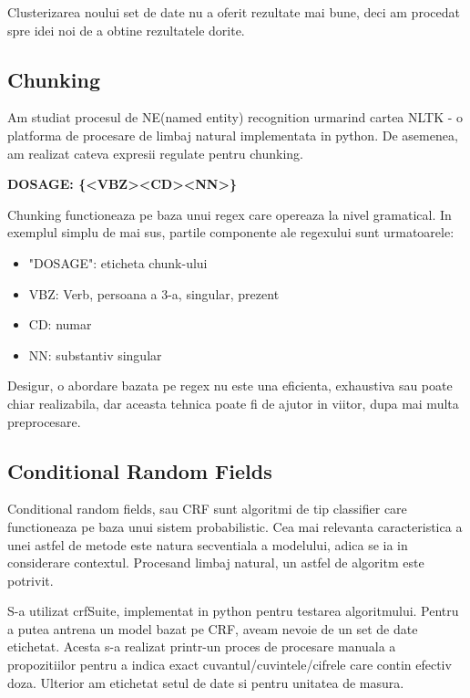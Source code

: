 \documentclass[a4paper,12pt]{article}
\begin{document}
 Clusterizarea noului set de date nu a oferit rezultate mai bune, deci am procedat spre idei noi de a obtine rezultatele dorite. 
 
 \subsection{Chunking}
 Am studiat procesul de NE(named entity) recognition urmarind cartea NLTK - o platforma de procesare de limbaj natural implementata in python.
 De asemenea, am realizat cateva expresii regulate pentru chunking. 
 
 \textbf{ DOSAGE: \{<VBZ><CD><NN>\}}

Chunking functioneaza pe baza unui regex care opereaza la nivel gramatical. In exemplul simplu de mai sus, partile componente ale regexului sunt urmatoarele:
\begin{itemize}
\item "DOSAGE": eticheta chunk-ului
\item VBZ: Verb, persoana a 3-a, singular, prezent
\item CD: numar
\item NN: substantiv singular
\end{itemize}

Desigur, o abordare bazata pe regex nu este una eficienta, exhaustiva sau poate chiar realizabila, dar aceasta tehnica poate fi de ajutor in viitor, dupa mai multa preprocesare.

\subsection{Conditional Random Fields}

Conditional random fields, sau CRF sunt algoritmi de tip classifier care functioneaza pe baza unui sistem probabilistic. Cea mai relevanta caracteristica a unei astfel de metode este natura secventiala a modelului, adica se ia in considerare contextul. Procesand limbaj natural, un astfel de algoritm este potrivit.

S-a utilizat crfSuite, implementat in python pentru testarea algoritmului.
Pentru a putea antrena un model bazat pe CRF, aveam nevoie de un set de date etichetat. Acesta s-a realizat printr-un proces de procesare manuala a propozitiilor pentru a indica exact cuvantul/cuvintele/cifrele care contin efectiv doza. Ulterior am etichetat setul de date si pentru unitatea de masura. 
\end{document}
